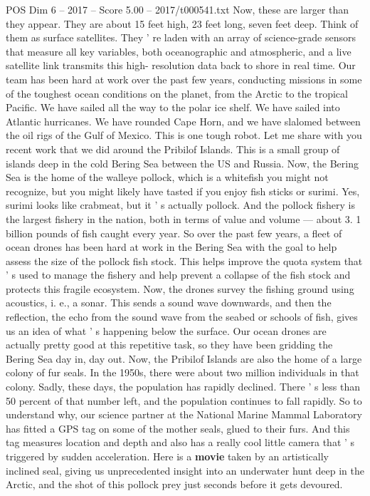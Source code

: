 \begin{textsample}{POS Dim 6 – 2017 – Score 5.00 – 2017/t000541.txt}
Now, these are larger than they appear.
They are about 15 feet high, 23 feet long, seven feet deep.
Think of them as surface satellites.
They ' re laden with an array of science-grade sensors that measure all key variables, both oceanographic and atmospheric, and a live satellite link transmits this high- resolution data back to shore in real time.
Our team has been hard at work over the past few years, conducting missions in some of the toughest ocean conditions on the planet, from the Arctic to the tropical Pacific.
We have sailed all the way to the polar ice shelf.
We have sailed into Atlantic hurricanes.
We have rounded Cape Horn, and we have slalomed between the oil rigs of the Gulf of Mexico.
This is one tough robot.
Let me share with you recent work that we did around the Pribilof Islands.
This is a small group of islands deep in the cold Bering Sea between the US and Russia.
Now, the Bering Sea is the home of the walleye pollock, which is a whitefish you might not recognize, but you might likely have tasted if you enjoy fish sticks or surimi.
Yes, surimi looks like crabmeat, but it ' s actually pollock.
And the pollock fishery is the largest fishery in the nation, both in terms of value and volume — about 3. 1 billion pounds of fish caught every year.
So over the past few years, a fleet of ocean drones has been hard at work in the Bering Sea with the goal to help assess the size of the pollock fish stock.
This helps improve the quota system that ' s used to manage the fishery and help prevent a collapse of the fish stock and protects this fragile ecosystem.
Now, the drones survey the fishing ground using acoustics, i. e., a sonar.
This sends a sound wave downwards, and then the reflection, the echo from the sound wave from the seabed or schools of fish, gives us an idea of what ' s happening below the surface.
Our ocean drones are actually pretty good at this repetitive task, so they have been gridding the Bering Sea day in, day out.
Now, the Pribilof Islands are also the home of a large colony of fur seals.
In the 1950s, there were about two million individuals in that colony.
Sadly, these days, the population has rapidly declined.
There ' s less than 50 percent of that number left, and the population continues to fall rapidly.
So to understand why, our science partner at the National Marine Mammal Laboratory has fitted a GPS tag on some of the mother seals, glued to their furs.
And this tag measures location and depth and also has a really cool little camera that ' s triggered by sudden acceleration.
Here is a \textbf{movie} taken by an artistically inclined seal, giving us unprecedented insight into an underwater hunt deep in the Arctic, and the shot of this pollock prey just seconds before it gets devoured.

\end{textsample}
